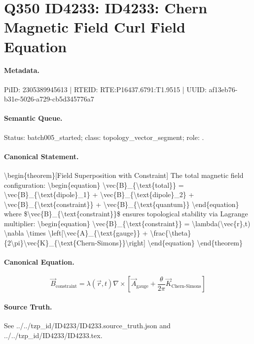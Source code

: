 \section*{Q350 ID4233: ID4233: Chern Magnetic Field Curl Field Equation}
\paragraph{Metadata.}
PiID: 2305389945613 | RTEID: RTE:P16437.6791:T1.9515 | UUID: af13eb76-b31e-5026-a729-cb5d345776a7

\paragraph{Semantic Queue.}
Status: batch005\_started; class: topology\_vector\_segment; role: .

\paragraph{Canonical Statement.}
\textbackslash{}begin\{theorem\}[Field Superposition with Constraint] The total magnetic field configuration: \textbackslash{}begin\{equation\} \textbackslash{}vec\{B\}\_\{\textbackslash{}text\{total\}\} = \textbackslash{}vec\{B\}\_\{\textbackslash{}text\{dipole\}\_1\} + \textbackslash{}vec\{B\}\_\{\textbackslash{}text\{dipole\}\_2\} + \textbackslash{}vec\{B\}\_\{\textbackslash{}text\{constraint\}\} + \textbackslash{}vec\{B\}\_\{\textbackslash{}text\{quantum\}\} \textbackslash{}end\{equation\} where \$\textbackslash{}vec\{B\}\_\{\textbackslash{}text\{constraint\}\}\$ ensures topological stability via Lagrange multiplier: \textbackslash{}begin\{equation\} \textbackslash{}vec\{B\}\_\{\textbackslash{}text\{constraint\}\} = \textbackslash{}lambda(\textbackslash{}vec\{r\},t) \textbackslash{}nabla \textbackslash{}times \textbackslash{}left[\textbackslash{}vec\{A\}\_\{\textbackslash{}text\{gauge\}\} + \textbackslash{}frac\{\textbackslash{}theta\}\{2\textbackslash{}pi\}\textbackslash{}vec\{K\}\_\{\textbackslash{}text\{Chern-Simons\}\}\textbackslash{}right] \textbackslash{}end\{equation\} \textbackslash{}end\{theorem\}

\paragraph{Canonical Equation.}
\[
\begin{equation} \vec{B}_{\text{constraint}} = \lambda(\vec{r},t) \nabla \times \left[\vec{A}_{\text{gauge}} + \frac{\theta}{2\pi}\vec{K}_{\text{Chern-Simons}}\right] \end{equation}
\]

\paragraph{Source Truth.}
See ../../tzp\_id/ID4233/ID4233.source\_truth.json and ../../tzp\_id/ID4233/ID4233.tex.
